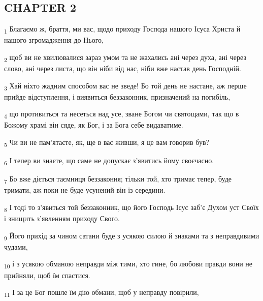 \subsection{CHAPTER 2}
\begin{tcolorbox}
\textsubscript{1} Благаємо ж, браття, ми вас, щодо приходу Господа нашого Ісуса Христа й нашого згромадження до Нього,
\end{tcolorbox}
\begin{tcolorbox}
\textsubscript{2} щоб ви не хвилювалися зараз умом та не жахались ані через духа, ані через слово, ані через листа, що він ніби від нас, ніби вже настав день Господній.
\end{tcolorbox}
\begin{tcolorbox}
\textsubscript{3} Хай ніхто жадним способом вас не зведе! Бо той день не настане, аж перше прийде відступлення, і виявиться беззаконник, призначений на погибіль,
\end{tcolorbox}
\begin{tcolorbox}
\textsubscript{4} що противиться та несеться над усе, зване Богом чи святощами, так що в Божому храмі він сяде, як Бог, і за Бога себе видаватиме.
\end{tcolorbox}
\begin{tcolorbox}
\textsubscript{5} Чи ви не пам'ятаєте, як, ще в вас живши, я це вам говорив був?
\end{tcolorbox}
\begin{tcolorbox}
\textsubscript{6} І тепер ви знаєте, що саме не допускає з'явитись йому своєчасно.
\end{tcolorbox}
\begin{tcolorbox}
\textsubscript{7} Бо вже діється таємниця беззаконня; тільки той, хто тримає тепер, буде тримати, аж поки не буде усунений він із середини.
\end{tcolorbox}
\begin{tcolorbox}
\textsubscript{8} І тоді то з'явиться той беззаконник, що його Господь Ісус заб'є Духом уст Своїх і знищить з'явленням приходу Свого.
\end{tcolorbox}
\begin{tcolorbox}
\textsubscript{9} Його прихід за чином сатани буде з усякою силою й знаками та з неправдивими чудами,
\end{tcolorbox}
\begin{tcolorbox}
\textsubscript{10} і з усякою обманою неправди між тими, хто гине, бо любови правди вони не прийняли, щоб їм спастися.
\end{tcolorbox}
\begin{tcolorbox}
\textsubscript{11} І за це Бог пошле їм дію обмани, щоб у неправду повірили,
\end{tcolorbox}
